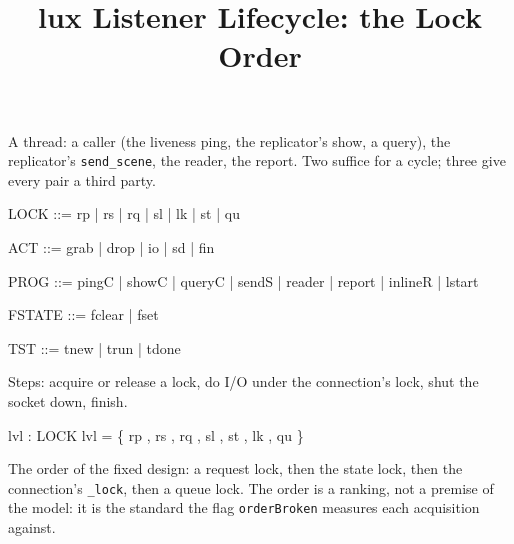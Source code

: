 \documentclass[a4paper,10pt,fleqn]{article}
\begin{document}
\title{lux Listener Lifecycle: the Lock Order}
\maketitle

\begin{zed}
  [T]
\end{zed}

A thread: a caller (the liveness ping, the replicator's show, a query), the
replicator's \texttt{send\_scene}, the reader, the report.  Two suffice for a
cycle; three give every pair a third party.

\begin{zed}
  LOCK ::= rp | rs | rq | sl | lk | st | qu
\end{zed}

\begin{zed}
  ACT ::= grab | drop | io | sd | fin
\end{zed}

\begin{zed}
  PROG ::= pingC | showC | queryC | sendS | reader | report | inlineR | lstart
\end{zed}

\begin{zed}
  FSTATE ::= fclear | fset
\end{zed}

\begin{zed}
  TST ::= tnew | trun | tdone
\end{zed}

Steps: acquire or release a lock, do I/O under the connection's lock, shut the
socket down, finish.

\begin{axdef}
  lvl : LOCK  
\where
  lvl = \{ rp , rs , rq , sl ,
    st , lk , qu  \}
\end{axdef}

The order of the fixed design: a request lock, then the state lock, then the
connection's \texttt{\_lock}, then a queue lock.  The order is a ranking, not
a premise of the model: it is the standard the flag \texttt{orderBroken}
measures each acquisition against.
\end{document}
